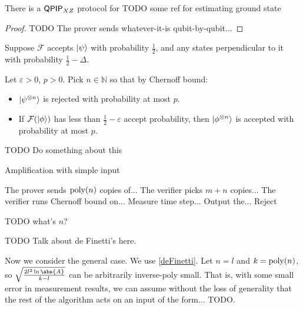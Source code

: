 \begin{theorem}
	There is a $\operatorname{\mathsf{QPIP}}_{XZ}$ protocol for TODO some ref for estimating ground state
\end{theorem}
\begin{proof}
	TODO The prover sends whatever-it-is qubit-by-qubit...
\end{proof}

Suppose $\mathcal{F}$ accepts $\ket{\psi}$ with probability $\frac{1}{2}$, and any states perpendicular to it with probability $\frac{1}{2}-\Delta$.

Let $\varepsilon>0$, $p>0$. Pick $n\in\mathbb{N}$ so that by Chernoff bound:
\begin{itemize}
	\item $\ket{\psi^{\otimes n}}$ is rejected with probability at most $p$.
	\item If $\mathcal{F}(\ket{\phi})$ has less than $\frac{1}{2}-\varepsilon$ accept probability, then $\ket{\phi^{\otimes n}}$ is accepted with probability at most $p$.
\end{itemize}

TODO Do something about this
\begin{algorithm}
	\caption{Amplification with simple input}
	\label{AlgAmp1}
	\begin{algorithmic}[1]
		\State The prover sends $\operatorname*{\operatorname{poly}}(n)$ copies of...
		\State The verifier picks $m+n$ copies...
		\State The verifier runs Chernoff bound on...
			\State Measure time step...
			\State Output the...
		\Else
			\State Reject
		\EndIf
	\end{algorithmic}
\end{algorithm}
TODO what's $n$?

TODO Talk about de Finetti's here.

Now we consider the general case. We use \autoref{deFinetti}. Let $n=l$ and $k=\operatorname*{\operatorname{poly}}(n)$, so $\sqrt{\frac{2l^2\ln\abs{A}}{k-l}}$ can be arbitrarily inverse-poly small. That is, with some small error in measurement results, we can assume without the loss of generality that the rest of the algorithm acts on an input of the form... TODO.

